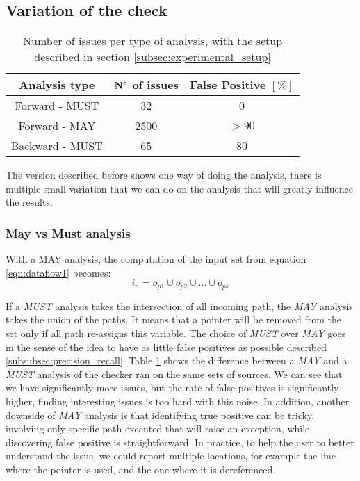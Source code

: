 \subsection{Variation of the check}
\label{subsec:rule_variation}

\begin{table}[h]
	\centering
	\caption{Number of issues per type of analysis, with the setup described in section \ref{subsec:experimental_setup}}
	\label{table:issue_per_analysis_type}
	\begin{tabular}{|c|c|c|}
		\hline
		\bf Analysis type &  \bf $\bf N^{\circ}$  of issues &  \bf False Positive $[\%]$ \\ \hline
		Forward - MUST &  32 &  0 \\ 
		Forward - MAY &  2500 & $> 90$  \\ 
		Backward - MUST &  65 & 80 \\ \hline
	\end{tabular}
\end{table}

The version described before shows one way of doing the analysis, there is multiple small variation that we can do on the analysis that will greatly influence the results.

\subsubsection{May vs Must analysis}
\label{subsubsec:may_vs_must}

With a MAY analysis, the computation of the input set from equation \ref{eqn:dataflow1} becomes:
\begin{equation}\label{eqn:mayvsmust}
i_{n} = o_{p1}  \cup   o_{p2}  \cup  ... \cup   o_{pk}
\end{equation}

If a \emph{MUST} analysis takes the intersection of all incoming path, the \emph{MAY} analysis takes the union of the paths. 
It means that a pointer will be removed from the set only if all path re-assigns this variable.
The choice of \emph{MUST} over \emph{MAY} goes in the sense of the idea to have as little false positives as possible described \ref{subsubsec:precision_recall}.
Table \ref{table:issue_per_analysis_type} shows the difference between a \emph{MAY} and a \emph{MUST} analysis of the checker ran on the same sets of sources.
We can see that we have significantly more issues, but the rate of false positives is significantly higher, finding interesting issues is too hard with this noise. 
In addition, another downside of \emph{MAY} analysis is that identifying true positive can be tricky, involving only specific path executed that will raise an exception, while discovering false positive is straightforward.
In practice, to help the user to better understand the issue, we could report multiple locations, for example the line where the pointer is used, and the one where it is dereferenced.

